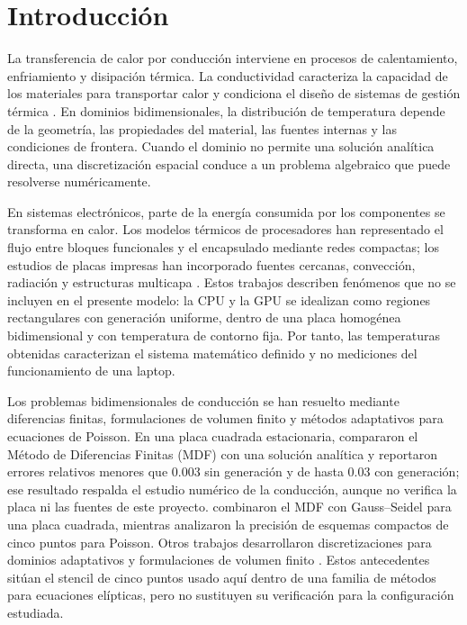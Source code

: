 \section{Introducci\'on}
\label{sec:introduccion}

La transferencia de calor por conducci\'on interviene en procesos de calentamiento, enfriamiento y disipaci\'on t\'ermica. La conductividad caracteriza la capacidad de los materiales para transportar calor y condiciona el dise\~no de sistemas de gesti\'on t\'ermica \citep{chung2001materials,zheng2021advances}. En dominios bidimensionales, la distribuci\'on de temperatura depende de la geometr\'ia, las propiedades del material, las fuentes internas y las condiciones de frontera. Cuando el dominio no permite una soluci\'on anal\'itica directa, una discretizaci\'on espacial conduce a un problema algebraico que puede resolverse num\'ericamente.

En sistemas electr\'onicos, parte de la energ\'ia consumida por los componentes se transforma en calor. Los modelos t\'ermicos de procesadores han representado el flujo entre bloques funcionales y el encapsulado mediante redes compactas; los estudios de placas impresas han incorporado fuentes cercanas, convecci\'on, radiaci\'on y estructuras multicapa \citep{skadron2003hotspot,harvest2007devices,moniervinard2015pcb,zhang2024pcb}. Estos trabajos describen fen\'omenos que no se incluyen en el presente modelo: la CPU y la GPU se idealizan como regiones rectangulares con generaci\'on uniforme, dentro de una placa homog\'enea bidimensional y con temperatura de contorno fija. Por tanto, las temperaturas obtenidas caracterizan el sistema matem\'atico definido y no mediciones del funcionamiento de una laptop.

Los problemas bidimensionales de conducci\'on se han resuelto mediante diferencias finitas, formulaciones de volumen finito y m\'etodos adaptativos para ecuaciones de Poisson. En una placa cuadrada estacionaria, \citet{santos2022finite} compararon el M\'etodo de Diferencias Finitas (MDF) con una soluci\'on anal\'itica y reportaron errores relativos menores que 0.003 sin generaci\'on y de hasta 0.03 con generaci\'on; ese resultado respalda el estudio num\'erico de la conducci\'on, aunque no verifica la placa ni las fuentes de este proyecto. \citet{oladejo2007tool} combinaron el MDF con Gauss--Seidel para una placa cuadrada, mientras \citet{settle2013compact} analizaron la precisi\'on de esquemas compactos de cinco puntos para Poisson. Otros trabajos desarrollaron discretizaciones para dominios adaptativos y formulaciones de volumen finito \citep{chen2007supra,raeli2018hierarchical,batty2017cell}. Estos antecedentes sit\'uan el stencil de cinco puntos usado aqu\'i dentro de una familia de m\'etodos para ecuaciones el\'ipticas, pero no sustituyen su verificaci\'on para la configuraci\'on estudiada.

